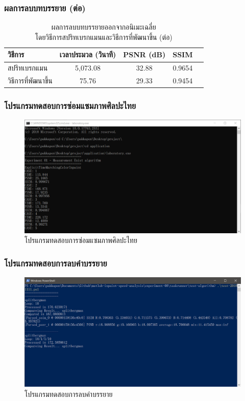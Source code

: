 \documentclass[xcolor=dvipsnames, xetex,serif]{beamer}
\numberwithin{equation}{section}
\begin{document}
		\begin{frame}
			\frametitle{ผลการลบบทบรรยาย (ต่อ)}
			\begin{table}[H]
				\centering
				\captionsetup{justification=centering}
				\begin{tabular}[ht]{|l|c|c|c|c|}
					\hline
					วิธีการ  & เวลาประมวล  (วินาที) & PSNR (dB) & SSIM \\
					\hline
					สปริทเบรกแมน & 5,073.08 & 32.88 & 0.9654 \\
					วิธีการที่พัฒนาขึ้น & 75.76 & 29.33 & 0.9454 \\
					\hline
				\end{tabular}
				\caption{ผลการลบบทบรรยายออกจากอนิเมะเฉลี่ย\\โดยวิธีการสปริทเบรกแมนและวิธีการที่พัฒนาขึ้น (ต่อ)}
			\end{table}	
		\end{frame}
		\begin{frame}
			\frametitle{โปรแกรมทดสอบการซ่อมแซมภาพศิลปะไทย}
			\begin{figure}
				\includegraphics[width=0.8\linewidth]{images/software_appendix/laboratory.png}
				\caption{โปรแกรมทดสอบการซ่อมแซมภาพศิลปะไทย}
			\end{figure}
		\end{frame}
		\begin{frame}
			\frametitle{โปรแกรมทดสอบการลบคำบรรยาย}
			\begin{figure}
				\includegraphics[width=0.8\linewidth]{images/software_appendix/lab_remove.png}
				\caption{โปรแกรมทดสอบการลบคำบรรยาย}
			\end{figure}
		\end{frame}
\end{document}
